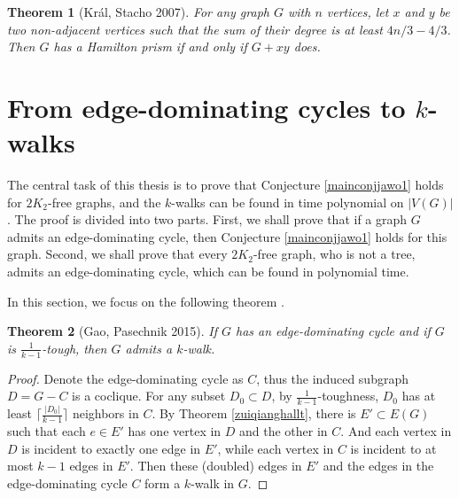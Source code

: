 \documentclass[12pt]{report}
\newtheorem{theorem}{Theorem}
\begin{document}
\begin{theorem}[Kr{\'a}l, Stacho 2007]\label{cloprihth2}
For any graph $G$ with $n$ vertices, let $x$ and $y$ be two non-adjacent vertices such that the sum of their degree is at least $4n/3-4/3$. Then $G$ has a Hamilton prism if and only if $G+xy$ does.

\end{theorem}


















\section{From edge-dominating cycles to $k$-walks}

The central task of this thesis is to prove that Conjecture \ref{mainconjjawo1} holds for $2K_2$-free graphs, and the $k$-walks can be found in time polynomial on $|V(G)|$. The proof is divided into two parts. First, we shall prove that if a graph $G$ admits an edge-dominating cycle, then Conjecture \ref{mainconjjawo1} holds for this graph. Second, we shall prove that every $2K_2$-free graph, who is not a tree, admits an edge-dominating cycle, which can be found in polynomial time.

In this section, we focus on the following theorem \cite{gao2015on}.


\begin{theorem}[Gao, Pasechnik 2015]\label{mthm1}
If $G$ has an edge-dominating cycle and if $G$ is $\frac{1}{k-1}$-tough, then $G$ admits a $k$-walk.
\end{theorem}

\begin{proof}
Denote the edge-dominating cycle as $C$, thus the induced subgraph $D=G-C$ is a coclique. For any subset $D_0\subset D$, by $\frac{1}{k-1}$-toughness, $D_0$ has at least $\lceil\frac{|D_0|}{k-1}\rceil$ neighbors in $C$. By  Theorem \ref{zuiqianghallt}, there is $E'\subset E(G)$ such that each $e\in E'$ has one vertex in $D$ and the other in $C$. And each vertex in $D$ is incident to exactly one edge in $E'$, while each vertex in $C$ is incident to at most $k-1$ edges in $E'$. Then these (doubled) edges in $E'$ and the edges in the edge-dominating cycle $C$ form a $k$-walk in $G$.
\end{proof}
\end{document}
